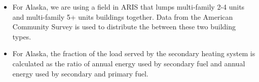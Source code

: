 \begin{itemize}
\item For Alaska, we are using a field in ARIS that lumps multi-family 2-4 units and multi-family 5+ units buildings together. Data from the American Community Survey is used to distribute the between these two building types.
\item For Alaska, the fraction of the load served by the secondary heating system is calculated as the ratio of annual energy used by secondary fuel and annual energy used by secondary and primary fuel.
\end{itemize}
